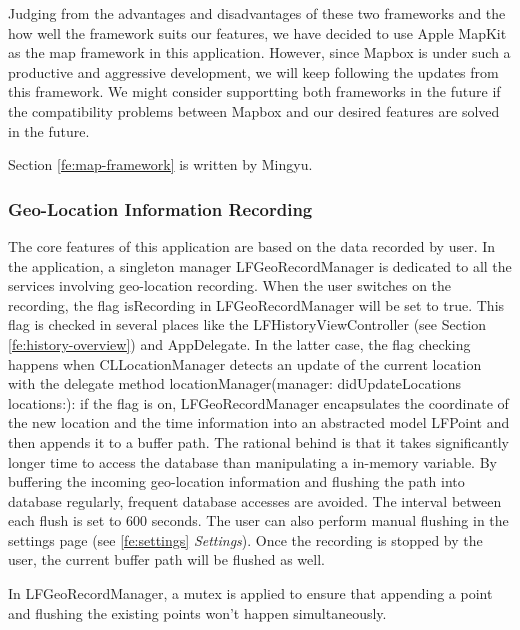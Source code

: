 \documentclass[12pt,a4paper]{article}
\renewcommand\texttt[1]{{\ttfamily\color{textttColor}#1}}
\begin{document}
                Judging from the advantages and disadvantages of these two frameworks and the how well the framework suits our features, we have decided to use Apple MapKit as the map framework in this application. However, since Mapbox is under such a productive and aggressive development, we will keep following the updates from this framework. We might consider supportting both frameworks in the future if the compatibility problems between Mapbox and our desired features are solved in the future.
                
                \footnotesize
                Section \ref{fe:map-framework} is written by Mingyu.
                \normalsize
            
            \subsubsection{Geo-Location Information Recording} %
                \label{fe:geolocation-information-recording}
                The core features of this application are based on the data recorded by user. In the application, a singleton manager \texttt{LFGeoRecordManager} is dedicated to all the services involving geo-location recording. When the user switches on the recording, the flag \texttt{isRecording} in \texttt{LFGeoRecordManager} will be set to \texttt{true}. This flag is checked in several places like the \texttt{LFHistoryViewController} (see Section \ref{fe:history-overview}) and \texttt{AppDelegate}. In the latter case, the flag checking happens when \texttt{CLLocationManager} detects an update of the current location with the delegate method \texttt{locationManager(manager: didUpdateLocations locations:)}: if the flag is on, \texttt{LFGeoRecordManager} encapsulates the coordinate of the new location and the time information into an abstracted model \texttt{LFPoint} and then appends it to a buffer path. The rational behind is that it takes significantly longer time to access the database than manipulating a in-memory variable. By buffering the incoming geo-location information and flushing the path into database regularly, frequent database accesses are avoided. The interval between each flush is set to 600 seconds. The user can also perform manual flushing in the settings page (see \ref{fe:settings} \textit{Settings}). Once the recording is stopped by the user, the current buffer path will be flushed as well.
                
                In \texttt{LFGeoRecordManager}, a mutex is applied to ensure that appending a point and flushing the existing points won't happen simultaneously.
                
\end{document}
